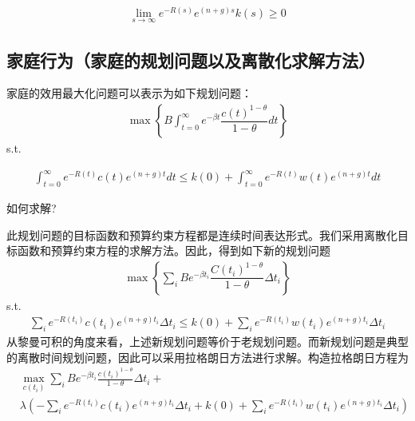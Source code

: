 \begin{gather}
\lim\limits_{s\to \infty}e^{-R(s)}e^{(n+g)s}k(s)\ge 0
\end{gather}



\subsection{ 家庭行为（家庭的规划问题以及离散化求解方法）}
家庭的效用最大化问题可以表示为如下规划问题：
\begin{gather}
	\max\left\{B\int_{t=0}^{\infty}e^{-\beta t}\dfrac{c(t)^{1-\theta}}{1-\theta}dt
	\right\}
\end{gather}
s.t.

\begin{gather}
	\int_{t=0}^{\infty}e^{-R(t)}c(t)e^{(n+g)t}dt\le
	k(0)+\int_{t=0}^{\infty}e^{-R(t)}w(t)e^{(n+g)t}dt
\end{gather}

如何求解?


此规划问题的目标函数和预算约束方程都是连续时间表达形式。我们采用离散化目标函数和预算约束方程的求解方法。因此，得到如下新的规划问题
\begin{gather}
	\max\left\{\sum_i Be^{-\beta t_i}\dfrac{C(t_i)^{1-\theta}}{1-\theta}\Delta t_i
	\right\}
\end{gather}
s.t.
\begin{gather}
	\sum_i e^{-R(t_i)}c(t_i)e^{(n+g)t_i}\Delta t_i\le
	k(0)+\sum_ie^{-R(t_i)}w(t_i)e^{(n+g)t_i}\Delta t_i
\end{gather}
从黎曼可积的角度来看，上述新规划问题等价于老规划问题。而新规划问题是典型的离散时间规划问题，因此可以采用拉格朗日方法进行求解。构造拉格朗日方程为
\begin{equation}
	\begin{aligned}
	& \max _{c\left(t_i\right)} \sum_i B e^{-\beta t_i} \frac{c\left(t_i\right)^{1-\theta}}{1-\theta} \Delta t_i+ \\
	& \lambda\left(-\sum_i e^{-R\left(t_i\right)} c\left(t_i\right) e^{(n+g) t_i} \Delta t_i+k(0)+\sum_i e^{-R\left(t_i\right)} w\left(t_i\right) e^{(n+g) t_i} \Delta t_i\right)
	\end{aligned}
	\end{equation}


